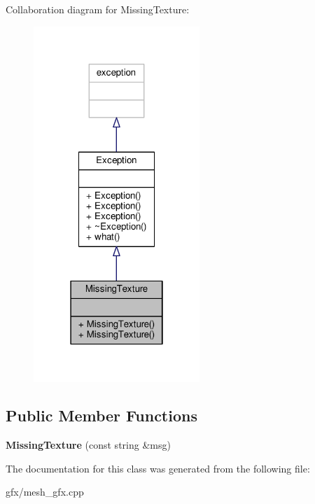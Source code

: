 Collaboration diagram for Missing\+Texture\+:
\nopagebreak
\begin{figure}[H]
\begin{center}
\leavevmode
\includegraphics[width=178pt]{dc/d27/classMissingTexture__coll__graph}
\end{center}
\end{figure}
\subsection*{Public Member Functions}
\begin{DoxyCompactItemize}
\item 
{\bfseries Missing\+Texture} (const string \&msg)\hypertarget{classMissingTexture_ac2c6e15bdeaa2beb92bb84d6d4dadabe}{}\label{classMissingTexture_ac2c6e15bdeaa2beb92bb84d6d4dadabe}

\end{DoxyCompactItemize}


The documentation for this class was generated from the following file\+:\begin{DoxyCompactItemize}
\item 
gfx/mesh\+\_\+gfx.\+cpp\end{DoxyCompactItemize}
